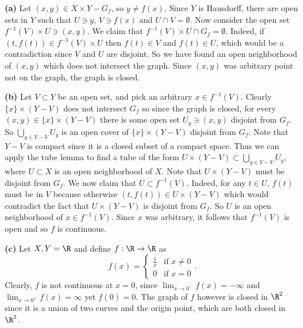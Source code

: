 \documentclass[11pt,letterpaper]{article}
\begin{document}
\begin{solution}
    \textbf{(a)} Let $(x,y)\in X\times Y-G_f$, so $y\neq f(x)$. Since $Y$ is Hausdorff, there are open sets in $Y$ such that $U\ni y$, $V\ni f(x)$ and $U\cap V=\emptyset$. Now consider the open set $f^{-1}(V)\times U\ni (x,y)$. We claim that $f^{-1}(V)\times U\cap G_f=\emptyset$. Indeed, if $(t, f(t))\in f^{-1}(V)\times U$ then $f(t)\in V$ and $f(t)\in U$, which would be a contradiction since $V$ and $U$ are disjoint. So we have found an open neighborhood of $(x,y)$ which does not intersect the graph. Since $(x,y)$ was arbitrary point not on the graph, the graph is closed. 

    \textbf{(b)} Let $V\subset Y$ be an open set, and pick an arbitrary $x\in f^{-1}(V)$. Clearly $\{x\}\times (Y-V)$ does not intersect $G_f$ so since the graph is closed, for every $(x,y)\in \{x\}\times (Y-V)$ there is some open set $U_y\ni (x,y)$ disjoint from $G_f$. So $\bigcup_{y\in Y-V}U_y$ is an open cover of $\{x\}\times (Y-V)$ disjoint from $G_f$. Note that $Y-V$ is compact since it is a closed subset of a compact space. Thus we can apply the tube lemma to find a tube of the form $U\times (Y-V)\subset \bigcup_{y\in Y-V}U_y$, where $U\subset X$ is an open neighborhood of $X$. Note that $U\times (Y-V)$ must be disjoint from $G_f$. We now claim that $U\subset f^{-1}(V)$. Indeed, for any $t\in U$, $f(t)$ must be in $V$ because otherwise $(t, f(t))\in U\times (Y-V)$ which would contradict the fact that $U\times (Y-V)$ is disjoint from $G_f$. So $U$ is an open neighborhood of $x\in f^{-1}(V)$. Since $x$ was arbitrary, it follows that $f^{-1}(V)$ is open and so $f$ is continuous. 

    \textbf{(c)} Let $X,Y=\R$ and define $f : \R \to \R$ as
    \[
        f(x)=\begin{cases}
            \frac{1}{x}&\textrm{if }x\neq 0\\ 0&\textrm{if }x=0
        \end{cases}
    .\] 
    Clearly, $f$ is not continuous at $x=0$, since $\lim_{x\to 0^-}f(x)=-\infty$ and $\lim_{x\to 0^+}f(x)=\infty$ yet $f(0)=0$. The graph of $f$ however is closed in $\R^2$ since it is a union of two curves and the origin point, which are both closed in $\R^2$.  
\end{solution}
\end{document}
